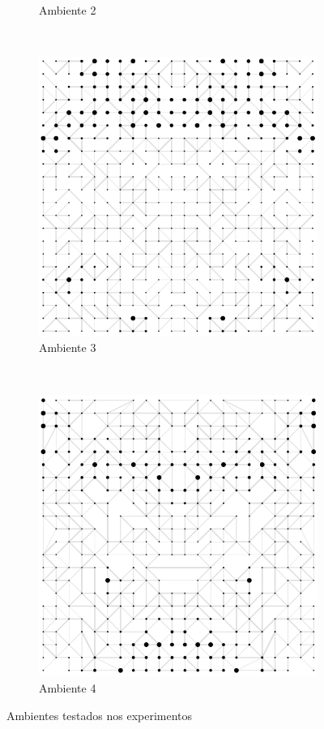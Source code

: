\documentclass{llncs}
\begin{document}
\begin{figure}[ht]
\begin{subfigure}[b]{0.48\textwidth}
              \caption{Ambiente 2}
              \label{fig:ambiente2}
      \end{subfigure}
      ~
      \begin{subfigure}[b]{0.48\textwidth}
              \includegraphics[width=\textwidth]{images/sim3.png}
              \caption{Ambiente 3}
              \label{fig:ambiente3}
      \end{subfigure}
      ~
      \begin{subfigure}[b]{0.48\textwidth}
              \includegraphics[width=\textwidth]{images/sim4.png}
              \caption{Ambiente 4}
              \label{fig:ambiente4}
      \end{subfigure}
      \caption{Ambientes testados nos experimentos}
      \label{fig:ambientes-testes}
\end{figure}
\end{document}
